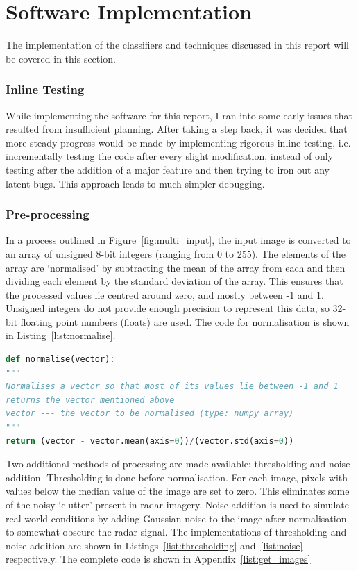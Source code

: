 \section{Software Implementation}
The implementation of the classifiers and techniques discussed in this report will be covered in this section. 

\subsubsection{Inline Testing}
While implementing the software for this report, I ran into some early issues that resulted from insufficient planning. After taking a step back, it was decided that more steady progress would be made by implementing rigorous inline testing, i.e. incrementally testing the code after every slight modification, instead of only testing after the addition of a major feature and then trying to iron out any latent bugs. This approach leads to much simpler debugging.

\subsubsection{Pre-processing}

In a process outlined in Figure~\ref{fig:multi_input}, the input image is converted to an array of unsigned 8-bit integers (ranging from 0 to 255). The elements of the array are `normalised' by subtracting the mean of the array from each and then dividing each element by the standard deviation of the array. This ensures that the processed values lie centred around zero, and mostly between -1 and 1. Unsigned integers do not provide enough precision to represent this data, so 32-bit floating point numbers (floats) are used. The code for normalisation is shown in Listing~\ref{list:normalise}.

\begin{lstlisting}[language=Python, caption=Normalisation method, captionpos=b, label={list:normalise}]
def normalise(vector):
"""
Normalises a vector so that most of its values lie between -1 and 1
returns the vector mentioned above
vector --- the vector to be normalised (type: numpy array)
"""
return (vector - vector.mean(axis=0))/(vector.std(axis=0))
\end{lstlisting}

Two additional methods of processing are made available: thresholding and noise addition. Thresholding is done before normalisation. For each image, pixels with values below the median value of the image are set to zero. This eliminates some of the noisy `clutter' present in radar imagery. Noise addition is used to simulate real-world conditions by adding Gaussian noise to the image after normalisation to somewhat obscure the radar signal. The implementations of thresholding and noise addition are shown in Listings~\ref{list:thresholding} and~\ref{list:noise} respectively. The complete code is shown in Appendix~\ref{list:get_images}


